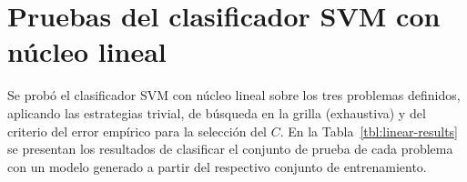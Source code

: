 %
%
%
\section{Pruebas del clasificador SVM con núcleo lineal}
%
Se probó el clasificador SVM con núcleo lineal sobre los tres
problemas definidos, aplicando las estrategias trivial, de búsqueda en
la grilla (exhaustiva) y del criterio del error empírico para la
selección del \hparam{} $C$.
En la Tabla~\ref{tbl:linear-results} se presentan los resultados de
clasificar el conjunto de prueba de cada problema con un modelo
generado a partir del respectivo conjunto de entrenamiento.
